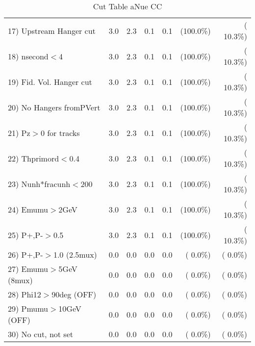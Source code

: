 \begin{table}[h!]
\begin{tabular}{||l||r|r|r|r|r|r||}
 17) Upstream Hanger cut  &          3.0 &          2.3 &          0.1 &          0.1 & (100.0\%) & ( 10.3\%) \\
 18) nsecond$<$4          &          3.0 &          2.3 &          0.1 &          0.1 & (100.0\%) & ( 10.3\%) \\
 19) Fid. Vol. Hanger cut &          3.0 &          2.3 &          0.1 &          0.1 & (100.0\%) & ( 10.3\%) \\
 20) No Hangers fromPVert &          3.0 &          2.3 &          0.1 &          0.1 & (100.0\%) & ( 10.3\%) \\
 21) Pz$>$0 for tracks    &          3.0 &          2.3 &          0.1 &          0.1 & (100.0\%) & ( 10.3\%) \\
 22) Thprimord$<$0.4      &          3.0 &          2.3 &          0.1 &          0.1 & (100.0\%) & ( 10.3\%) \\
 23) Nunh*fracunh$<$200   &          3.0 &          2.3 &          0.1 &          0.1 & (100.0\%) & ( 10.3\%) \\
 24) Emumu$>$2GeV         &          3.0 &          2.3 &          0.1 &          0.1 & (100.0\%) & ( 10.3\%) \\
 25) P+,P-$>$0.5          &          3.0 &          2.3 &          0.1 &          0.1 & (100.0\%) & ( 10.3\%) \\
 26) P+,P-$>$1.0 (2.5mux) &          0.0 &          0.0 &          0.0 &          0.0 & (  0.0\%) & (  0.0\%) \\
 27) Emumu$>$5GeV  (8mux) &          0.0 &          0.0 &          0.0 &          0.0 & (  0.0\%) & (  0.0\%) \\
 28) Phi12$>$90deg  (OFF) &          0.0 &          0.0 &          0.0 &          0.0 & (  0.0\%) & (  0.0\%) \\
 29) Pmumu$>$10GeV  (OFF) &          0.0 &          0.0 &          0.0 &          0.0 & (  0.0\%) & (  0.0\%) \\
 30) No cut, not set      &          0.0 &          0.0 &          0.0 &          0.0 & (  0.0\%) & (  0.0\%) \\
 \hline
 \hline
 \end{tabular}
 \caption{Cut Table  aNue CC  }
 \label{tab-cutheavy_neutrino_3.000}
 \end{table}
